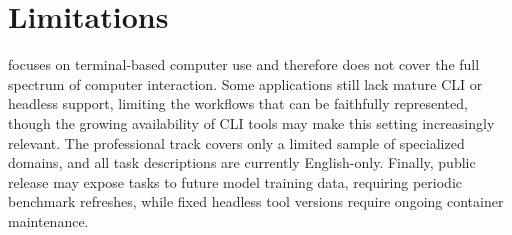 \section{Limitations}\label{sec:limitations-detail}

\benchname focuses on terminal-based computer use and therefore does not cover the full spectrum of computer interaction. Some applications still lack mature CLI or headless support, limiting the workflows that can be faithfully represented, though the growing availability of CLI tools may make this setting increasingly relevant. The professional track covers only a limited sample of specialized domains, and all task descriptions are currently English-only. Finally, public release may expose tasks to future model training data, requiring periodic benchmark refreshes, while fixed headless tool versions require ongoing container maintenance.

